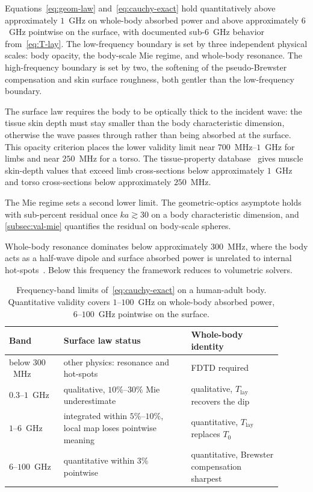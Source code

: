 \documentclass[journal,twocolumn,10pt]{IEEEtran}
\theoremstyle{plain}
\newcommand{\Tlay}{T_{\mathrm{lay}}}
\begin{document}
Equations~\eqref{eq:geom-law} and~\eqref{eq:cauchy-exact} hold
quantitatively above approximately $1$~GHz on whole-body absorbed
power and above approximately $6$~GHz pointwise on the surface, with
documented sub-$6$~GHz behavior from~\eqref{eq:T-lay}. The
low-frequency boundary is set by three independent physical scales:
body opacity, the body-scale Mie regime, and whole-body resonance.
The high-frequency boundary is set by two, the softening of the
pseudo-Brewster compensation and skin surface roughness, both gentler
than the low-frequency boundary.

The surface law requires the body to be optically thick to the
incident wave: the tissue skin depth must stay smaller than the body
characteristic dimension, otherwise the wave passes through rather
than being absorbed at the surface. This opacity criterion places
the lower validity limit near $700$~MHz--$1$~GHz for limbs and near
$250$~MHz for a torso. The tissue-property
database~\cite{Gabriel1996} gives muscle skin-depth values that
exceed limb cross-sections below approximately $1$~GHz and torso
cross-sections below approximately $250$~MHz.

The Mie regime sets a second lower limit. The geometric-optics
asymptote holds with sub-percent residual once $ka \gtrsim 30$ on a
body characteristic dimension, and \cref{subsec:val-mie} quantifies
the residual on body-scale spheres.

Whole-body resonance dominates below approximately $300$~MHz, where
the body acts as a half-wave dipole and surface absorbed power is
unrelated to internal hot-spots~\cite{Durney1986}. Below this
frequency the framework reduces to volumetric solvers.

\begin{table}[!t]
\centering
\caption{Frequency-band limits of~\eqref{eq:cauchy-exact} on a
human-adult body. Quantitative validity covers $1$--$100$~GHz on
whole-body absorbed power, $6$--$100$~GHz pointwise on the
surface.}
\label{tab:bands}
\small
\setlength{\tabcolsep}{4pt}
\begin{tabular}{@{}>{\raggedright\arraybackslash}p{0.18\linewidth}
                  >{\raggedright\arraybackslash}p{0.42\linewidth}
                  >{\raggedright\arraybackslash}p{0.30\linewidth}@{}}
\toprule
Band & Surface law status & Whole-body identity \\
\midrule
below $300$~MHz
  & other physics: resonance and hot-spots
  & FDTD required \\
$0.3$--$1$~GHz
  & qualitative, $10\%$--$30\%$ Mie underestimate
  & qualitative, $\Tlay$ recovers the dip \\
$1$--$6$~GHz
  & integrated within $5\%$--$10\%$, local map loses pointwise meaning
  & quantitative, $\Tlay$ replaces $T_0$ \\
$6$--$100$~GHz
  & quantitative within $3\%$ pointwise
  & quantitative, Brewster compensation sharpest \\
\bottomrule
\end{tabular}
\end{table}
\end{document}
